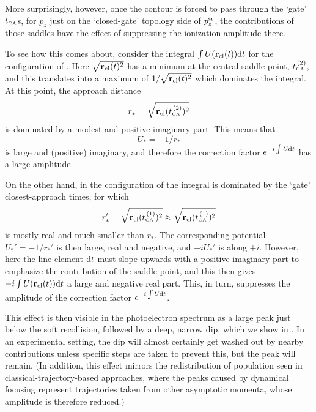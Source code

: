More surprisingly, however, once the contour is forced to pass through the `gate' ${t_{\scriptscriptstyle\mathrm{CA}}}$s, for $p_z$ just on the `closed-gate' topology side of $p_z^{\mathrm{sr}}$, the contributions of those saddles have the effect of suppressing the ionization amplitude there.

To see how this comes about, consider the integral $\int U(\vb{r}_{\mathrm{cl}}(t))\mathrm{d} t$ for the configuration of . Here $\sqrt{\vb{r}_{\mathrm{cl}}(t)^2}$ has a minimum at the central saddle point, ${t_{\scriptscriptstyle\mathrm{CA}}^{{\,(2)}}}$, and this translates into a maximum of $1/\sqrt{\vb{r}_{\mathrm{cl}}(t)^2}$ which dominates the integral. At this point, the approach distance 
\begin{equation}
r_\ast=\sqrt{\vb{r}_{\mathrm{cl}}({t_{\scriptscriptstyle\mathrm{CA}}^{{\,(2)}}})^2}
\end{equation}
is dominated by a modest and positive imaginary part. This means that 
\begin{equation}
U_\ast=-1/r_\ast
\end{equation}
is large and (positive) imaginary, and therefore the correction factor $e^{-i\int U\mathrm{d} t}$ has a large amplitude.

On the other hand, in the configuration of  the integral is dominated by the `gate' closest-approach times, for  which
\begin{equation}
r_\ast'=\sqrt{\vb{r}_{\mathrm{cl}}({t_{\scriptscriptstyle\mathrm{CA}}^{{\,(1)}}})^2}\approx\sqrt{\vb{r}_{\mathrm{cl}}({t_{\scriptscriptstyle\mathrm{CA}}^{{\,(1)}}})^2}
\end{equation} 
is mostly real and much smaller than $r_\ast$. The corresponding potential $U_\ast'=-1/r_\ast'$ is then large, real and negative, and $-iU_\ast'$ is along $+i$. However, here the line element $\mathrm{d} t$ must slope upwards with a positive imaginary part to emphasize the contribution of the saddle point, and this then gives $-i\int U(\vb{r}_{\mathrm{cl}}(t))\mathrm{d} t$ a large and negative real part. This, in turn, suppresses the amplitude of the correction factor $e^{-i\int U\mathrm{d} t}$. 




This effect is then visible in the photoelectron spectrum as a large peak just below the soft recollision, followed by a deep, narrow dip, which we show in . In an experimental setting, the dip will almost certainly get washed out by nearby contributions unless specific steps are taken to prevent this, but the peak will remain. (In addition, this effect mirrors the redistribution of population seen in classical-trajectory-based approaches, where the peaks caused by dynamical focusing represent trajectories taken from other asymptotic momenta, whose amplitude is therefore reduced.)



